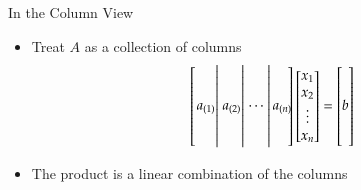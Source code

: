 \documentclass[10pt]{beamer}
\begin{document}
\begin{frame}{In the Column View}
\begin{itemize}
    \item Treat $A$ as a collection of columns
\begin{equation*}
    \begin{bmatrix}\left. \begin{matrix} \\ \\ a_{(1)}  \\ \\ \\ \end{matrix}\right|
                   \left. \begin{matrix} \\ \\ a_{(2)}  \\ \\ \\ \end{matrix}\right|
                   \left. \begin{matrix} \\ \\ {\cdots\ } \\ \\ \\ \end{matrix}\right|
                          \begin{matrix} \\ \\ a_{(n)}  \\ \\ \\ \end{matrix}\negthickspace
    \end{bmatrix}
    \begin{bmatrix} x_1 \\ x_2 \\ \vdots \\ x_n \end{bmatrix}
    =
    \begin{bmatrix}  \\  \\ b \\  \\  \\ \end{bmatrix}
\end{equation*}
\item The product is a linear combination of the columns

\end{itemize}
\end{frame}
\end{document}
